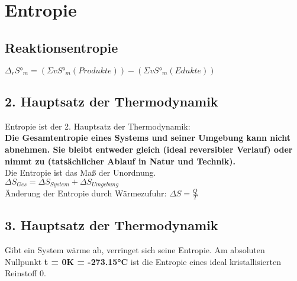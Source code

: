 \section{Entropie} \label{sec:entropie}

\subsection{Reaktionsentropie}
$\Delta_rS°_m = (\Sigma vS°_m(Produkte)) - (\Sigma vS°_m(Edukte))$

\subsection{ 2. Hauptsatz der Thermodynamik}
Entropie ist der 2. Hauptsatz der Thermodynamik: \\
\textbf{
Die Gesamtentropie eines Systems und seiner Umgebung kann nicht abnehmen. 
Sie bleibt entweder gleich (ideal reversibler Verlauf) oder nimmt zu (tatsächlicher Ablauf in Natur und Technik).
} \\
Die Entropie ist das Maß der Unordnung. \\
$\Delta S_{Ges} = \Delta S_{System} + \Delta S_{Umgebung}$ \\
Änderung der Entropie durch Wärmezufuhr:
$\Delta S = \frac{Q}{T}$ 

\subsection{ 3. Hauptsatz der Thermodynamik}
Gibt ein System wärme ab, verringet sich seine Entropie.
Am absoluten Nullpunkt \textbf{t = 0K = -273.15°C} ist die Entropie eines ideal kristallisierten Reinstoff 0.

